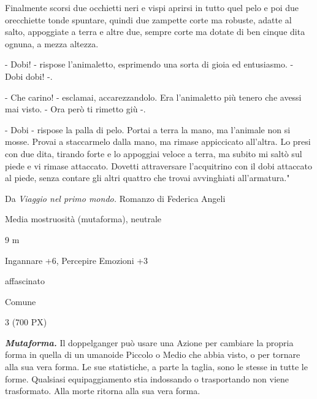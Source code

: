 \begin{multicols}{2}
{Finalmente scorsi due occhietti neri e vispi aprirsi in tutto quel pelo e poi due orecchiette tonde spuntare, quindi due zampette corte ma robuste, adatte al salto, appoggiate a terra e altre due, sempre corte ma dotate di ben cinque dita ognuna, a mezza altezza.

- Dobi! - rispose l'animaletto, esprimendo una sorta di gioia ed entusiasmo. - Dobi dobi! -.

- Che carino! - esclamai, accarezzandolo. Era l'animaletto più tenero che avessi mai visto. - Ora però ti rimetto giù -.

- Dobi - rispose la palla di pelo.
Portai a terra la mano, ma l'animale non si mosse. Provai a staccarmelo dalla mano, ma rimase appiccicato all'altra. Lo presi con due dita, tirando forte e lo appoggiai veloce a terra, ma subito mi saltò sul piede e vi rimase attaccato. Dovetti attraversare l'acquitrino con il dobi attaccato al piede, senza contare gli altri quattro che trovai avvinghiati all'armatura."


Da \emph{Viaggio nel primo mondo.} Romanzo di Federica Angeli

\begin{description}[noitemsep, topsep=0pt, parsep=0pt, partopsep=0pt, itemsep=1pt, leftmargin=2.35cm,  labelwidth=2.2cm, itemindent=0cm, listparindent=0pt] %
\setlength{\baselineskip}{10pt}
\item[\textbf{Taglia/Tipo}] Media mostruosità (mutaforma), neutrale
\item[\textbf{Caratt.}] 
\item[\textbf{Punti Ferita}] 
\item[\textbf{Movimento}] 9 m
\item[\textbf{Tiri Salvez.}] 
\item[\textbf{Comp.}] Ingannare +6, Percepire Emozioni +3
\item[\textbf{Immunità}] affascinato
\item[\textbf{Sensi}] 
\item[\textbf{Linguaggi}] Comune
\item[\textbf{Sfida}] 3 (700 PX)
\end{description}
\smallskip

\emph{\textbf{Mutaforma.}} Il doppelganger può usare una Azione per cambiare la propria forma in quella di un umanoide Piccolo o Medio che abbia visto, o per tornare alla sua vera forma. Le sue statistiche, a parte la taglia, sono le stesse in tutte le forme. Qualsiasi equipaggiamento stia indossando o trasportando non viene trasformato. Alla morte ritorna alla sua vera forma.

}
\end{multicols}
